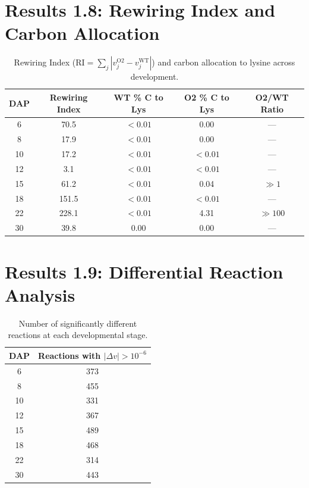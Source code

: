 \documentclass[11pt,letterpaper]{article}
\begin{document}
\clearpage


\section{Results 1.8: Rewiring Index and Carbon Allocation}

\begin{table}[H]
\centering
\caption{Rewiring Index ($\mathrm{RI} = \sum_j |v_j^{\mathrm{O2}} - v_j^{\mathrm{WT}}|$) and carbon allocation to lysine across development.}
\label{stab:rewiring_index}
\begin{tabular}{ccccc}
\toprule
DAP & Rewiring Index & WT \% C to Lys & O2 \% C to Lys & O2/WT Ratio \\
\midrule
6  & 70.5  & $<0.01$ & 0.00   & ---   \\
8  & 17.9  & $<0.01$ & 0.00   & ---   \\
10 & 17.2  & $<0.01$ & $<0.01$ & ---  \\
12 & 3.1   & $<0.01$ & $<0.01$ & ---  \\
15 & 61.2  & $<0.01$ & 0.04   & $\gg 1$ \\
18 & 151.5 & $<0.01$ & $<0.01$ & ---  \\
22 & 228.1 & $<0.01$ & 4.31   & $\gg 100$ \\
30 & 39.8  & 0.00    & 0.00   & ---   \\
\bottomrule
\end{tabular}
\end{table}

\clearpage


\section{Results 1.9: Differential Reaction Analysis}

\begin{table}[H]
\centering
\caption{Number of significantly different reactions at each developmental stage.}
\label{stab:diff_summary}
\begin{tabular}{cc}
\toprule
DAP & Reactions with $|\Delta v| > 10^{-6}$ \\
\midrule
6  & 373 \\
8  & 455 \\
10 & 331 \\
12 & 367 \\
15 & 489 \\
18 & 468 \\
22 & 314 \\
30 & 443 \\
\bottomrule
\end{tabular}
\end{table}
\end{document}
